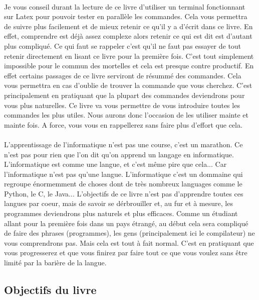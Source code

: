 \documentclass{article}
\begin{document}
\paragraph{}  
Je vous conseil durant la lecture de ce livre d'utiliser un terminal fonctionnant sur Latex pour pouvoir tester en parall\`ele les commandes. Cela vous permettra de suivre plus facilement et de mieux retenir ce qu'il y a d'\'ecrit dans ce livre. En effet, comprendre est d\'ej\`a assez complexe alors retenir ce qui est dit est d'autant plus compliqu\'e. Ce qui faut se rappeler c'est qu'il ne faut pas essayer de tout retenir directement en lisant ce livre pour la premi\`ere fois. C'est tout simplement impossible pour le commun des mortelles et cela est presque contre productif. En effet certains passages de ce livre serviront de r\'esumm\'e des commandes. Cela vous permettra en cas d'oublie de trouver la commande que vous cherchez. C'est principalement en pratiquant que la plupart des commandes deviendrons pour vous plus naturelles. Ce livre va vous permettre de vous introduire toutes les commandes les plus utiles. Nous aurons donc l'occasion de les utiliser mainte et mainte fois. A force, vous vous en rappellerez sans faire plus d'effort que cela.

\paragraph{}  
L'apprentissage de l'informatique n'est pas une course, c'est un marathon. Ce n'est pas pour rien que l'on dit qu'on apprend un langage en informatique. L'informatique est comme une langue, et c'est même pire que cela... Car l'informatique n'est pas qu'une langue. L'informatique c'est un dommaine qui regroupe \'enormemment de choses dont de tr\`es nombreux languages comme le Python, le C, le Java... L'objectifs de ce livre n'est pas d'apprendre toutes ces langues par coeur, mais de savoir se d\'erbrouiller et, au fur et à mesure, les programmes deviendrons plus naturels et plus efficaces. Comme un \'etudiant allant pour la premi\`ere fois dans un pays \'etrang\'e, au d\'ebut cela sera compliqu\'e de faire des phrases (programmes), les gens (principalement ici le compilateur) ne vous comprendrons pas. Mais cela est tout \`a fait normal. C'est en pratiquant que vous progresserez et que vous finirez par faire tout ce que vous voulez sans \^etre limit\'e par la bari\`ere de la langue. 

\newpage

\subsection{Objectifs du livre}
\end{document}
